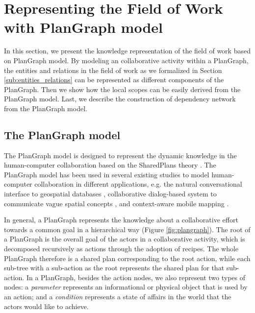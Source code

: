 \section{Representing the Field of Work with PlanGraph model} %
\label{sec:representing_the_field_of_work}
In this section, we present the knowledge representation of the field of work based on PlanGraph model. By modeling an collaborative activity within a PlanGraph, the entities and relations in the field of work as we formalized in Section \ref{sub:entities_relations} can be represented as different components of the PlanGraph. Then we show how the local scopes can be easily derived from the PlanGraph model. Last, we describe the construction of dependency network from the PlanGraph model.


\subsection{The PlanGraph model} %
\label{sub:the_plangraph_model}

The PlanGraph model is designed to represent the dynamic knowledge in the human-computer collaboration based on the SharedPlans theory \cite{Cai2005}. The PlanGraph model has been used in several existing studies to model human-computer collaboration in different applications, e.g. the natural conversational interface to geospatial databases \cite{Cai2005}, collaborative dialog-based system to communicate vague spatial concepts \cite{Cai2003}, and context-aware mobile mapping \cite{yu2010using}. 

In general, a PlanGraph represents the knowledge about a collaborative effort towards a common goal in a hierarchical way (Figure \ref{fig:plangraph}). The root of a PlanGraph is the overall goal of the actors in a collaborative activity, which is decomposed recursively as actions through the adoption of recipes. The whole PlanGraph therefore is a shared plan corresponding to the root action, while each sub-tree with a sub-action as the root represents the shared plan for that sub-action. In a PlanGraph, besides the action nodes, we also represent two types of nodes: a \emph{parameter} represents an informational or physical object that is used by an action; and a \emph{condition} represents a state of affairs in the world that the actors would like to achieve. 

